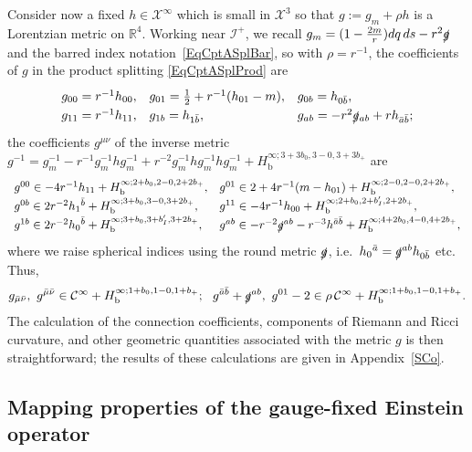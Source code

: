 \documentclass[reqno,11pt,letterpaper]{amsart}
\numberwithin{equation}{section}
\numberwithin{figure}{section}
\theoremstyle{definition}
\theoremstyle{remark}
\newcommand{\mc}{\mathcal}
\newcommand{\cC}{\mc C}
\newcommand{\cX}{\mc X}
\newcommand{\ms}{\mathscr}
\newcommand{\scri}{\ms I}
\newcommand{\R}{\mathbb{R}}
\newcommand{\slg}{\slashed{g}{}}
\newcommand{\bop}{{\mathrm{b}}}
\newcommand{\half}{\tfrac{1}{2}}
\newcommand{\CI}{\cC^\infty}
\newcommand{\Hb}{H_{\bop}}
\newcommand{\setarraystretch}{\def\arraystretch{1.25}}
\begin{document}
Consider now a fixed $h\in\cX^\infty$ which is small in $\cX^3$ so that $g:=g_m+\rho h$ is a Lorentzian metric on $\R^4$. Working near $\scri^+$, we recall $g_m=(1-\tfrac{2 m}{r})dq\,ds-r^2\slg$ and the barred index notation~\eqref{EqCptASplBar}, so with $\rho=r^{-1}$, the coefficients of $g$ in the product splitting \eqref{EqCptASplProd} are
\begin{equation}
\label{EqEinFMetric}
  \setarraystretch
  \begin{array}{lll}
    g_{0 0}=r^{-1}h_{0 0}, & g_{0 1}=\half+r^{-1}(h_{0 1}-m), & g_{0 b}=h_{0\bar b}, \\
    g_{1 1}=r^{-1}h_{1 1}, & g_{1 b}=h_{1\bar b}, & g_{a b}=-r^2\slg_{a b}+r h_{\bar a\bar b};
  \end{array}
\end{equation}
the coefficients $g^{\mu\nu}$ of the inverse metric $g^{-1}=g_m^{-1}-r^{-1}g_m^{-1}h g_m^{-1}+r^{-2}g_m^{-1}h g_m^{-1}h g_m^{-1}+\Hb^{\infty;3+3 b_0,3-0,3+3 b_+}$ are
\begin{equation}
\label{EqEinFinverse}
  \setarraystretch
  \begin{array}{ll}
    g^{0 0} \in -4 r^{-1}h_{1 1} + \Hb^{\infty;2+b_0,2-0,2+2 b_+}, & g^{0 1} \in 2 + 4 r^{-1}(m-h_{0 1}) + \Hb^{\infty;2-0,2-0,2+2 b_+}, \\
    g^{0 b} \in 2 r^{-2}h_1{}^{\bar b} + \Hb^{\infty;3+b_0,3-0,3+2 b_+}, & g^{1 1} \in -4 r^{-1}h_{0 0} + \Hb^{\infty;2+b_0,2+b'_I,2+2 b_+}, \\
    g^{1 b} \in 2 r^{-2}h_0{}^{\bar b} + \Hb^{\infty;3+b_0,3+b'_I,3+2 b_+}, & g^{a b} \in -r^{-2}\slg^{a b} - r^{-3}h^{\bar a\bar b} + \Hb^{\infty;4+2 b_0,4-0,4+2 b_+},
  \end{array}
\end{equation}
where we raise spherical indices using the round metric $\slg$, i.e.\ $h_0{}^{\bar a}=\slg^{a b}h_{0\bar b}$ etc. Thus,
\begin{equation}
\label{EqEinFMetricRough}
  g_{\bar\mu\bar\nu},\ g^{\bar\mu\bar\nu}\in\CI+\Hb^{\infty;1+b_0,1-0,1+b_+};\ \ 
  g^{\bar a\bar b}+\slg^{a b},\ g^{0 1}-2 \in \rho\,\CI+\Hb^{\infty;1+b_0,1-0,1+b_+}.
\end{equation}
The calculation of the connection coefficients, components of Riemann and Ricci curvature, and other geometric quantities associated with the metric $g$ is then straightforward; the results of these calculations are given in Appendix~\ref{SCo}.


\subsection{Mapping properties of the gauge-fixed Einstein operator}
\label{SsEinP}
\end{document}
